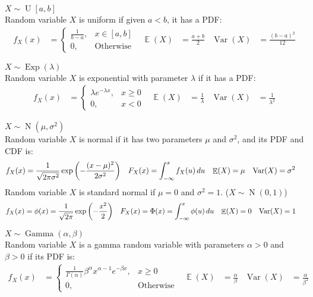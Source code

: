\documentclass{huhtakm-template-book-v2}
\DeclareMathOperator{\E}{\mathbb{E}}
\DeclareMathOperator{\Var}{Var}
\DeclareMathOperator{\Exp}{Exp}
\DeclareMathOperator{\N}{N}
\DeclareMathOperator{\U}{U}
\DeclareMathOperator{\Gam}{Gamma}
\begin{document}
\begin{eg} $X\sim\U[a,b]$\\
	Random variable $X$ is uniform if given $a<b$, it has a PDF:
	\begin{align*}
		f_{X}(x)&=\begin{cases}
			\frac{1}{b-a}, &x\in[a,b]\\
			0, &\text{Otherwise}
		\end{cases} & \E(X)&=\frac{a+b}{2} & \Var(X)&=\frac{(b-a)^{2}}{12}
	\end{align*}
\end{eg}
\begin{eg} $X\sim\Exp(\lambda)$\\
	Random variable $X$ is exponential with parameter $\lambda$ if it has a PDF:
	\begin{align*}
		f_{X}(x)&=\begin{cases}
			\lambda e^{-\lambda x}, &x\geq 0\\
			0, &x<0
		\end{cases} & \E(X)&=\frac{1}{\lambda} & \Var(X)&=\frac{1}{\lambda^{2}}
	\end{align*}
\end{eg}
\begin{eg} $X\sim\N(\mu,\sigma^{2})$\\
	Random variable $X$ is normal if it has two parameters $\mu$ and $\sigma^{2}$, and its PDF and CDF is:
	\begin{align*}
		f_{X}(x)&=\frac{1}{\sqrt{2\pi\sigma^{2}}}\exp\left(-\frac{(x-\mu)^{2}}{2\sigma^{2}}\right) & F_{X}(x)&=\intlu{-\infty}{x}f_{X}(u)\,du & \E(X)&=\mu & \Var(X)&=\sigma^{2}
	\end{align*}
	Random variable $X$ is standard normal if $\mu=0$ and $\sigma^{2}=1$. ($X\sim\N(0,1)$)
	\begin{align*}
		f_{X}(x)&=\phi(x)=\frac{1}{\sqrt{2\pi}}\exp\left(-\frac{x^{2}}{2}\right) & F_{X}(x)&=\Phi(x)=\intlu{-\infty}{x}\phi(u)\,du & \E(X)&=0 & \Var(X)&=1
	\end{align*}
\end{eg}
\begin{eg} $X\sim\Gam(\alpha,\beta)$\\
	Random variable $X$ is a gamma random variable with parameters $\alpha>0$ and $\beta>0$ if its PDF is:
	\begin{align*}
		f_{X}(x)&=\begin{cases}
			\frac{1}{\Gamma(\alpha)}\beta^{\alpha}x^{\alpha-1}e^{-\beta x}, &x\geq 0\\
			0, &\text{Otherwise}
		\end{cases} & \E(X)&=\frac{\alpha}{\beta} & \Var(X)&=\frac{\alpha}{\beta^{2}}
	\end{align*}
\end{eg}
\end{document}
